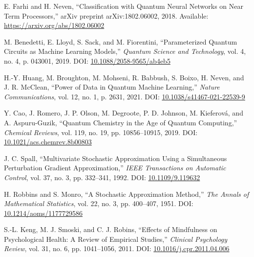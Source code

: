 \documentclass[11pt,letterpaper]{article}
\begin{document}
\begin{thebibliography}{99}
E. Farhi and H. Neven,
``Classification with Quantum Neural Networks on Near Term Processors,''
arXiv preprint arXiv:1802.06002, 2018.
Available: \url{https://arxiv.org/abs/1802.06002}

M. Benedetti, E. Lloyd, S. Sack, and M. Fiorentini,
``Parameterized Quantum Circuits as Machine Learning Models,''
\textit{Quantum Science and Technology}, vol. 4, no. 4, p. 043001, 2019.
DOI: \href{https://doi.org/10.1088/2058-9565/ab4eb5}{10.1088/2058-9565/ab4eb5}

H.-Y. Huang, M. Broughton, M. Mohseni, R. Babbush, S. Boixo, H. Neven, and J. R. McClean,
``Power of Data in Quantum Machine Learning,''
\textit{Nature Communications}, vol. 12, no. 1, p. 2631, 2021.
DOI: \href{https://doi.org/10.1038/s41467-021-22539-9}{10.1038/s41467-021-22539-9}

Y. Cao, J. Romero, J. P. Olson, M. Degroote, P. D. Johnson, M. Kieferová, and A. Aspuru-Guzik,
``Quantum Chemistry in the Age of Quantum Computing,''
\textit{Chemical Reviews}, vol. 119, no. 19, pp. 10856--10915, 2019.
DOI: \href{https://doi.org/10.1021/acs.chemrev.8b00803}{10.1021/acs.chemrev.8b00803}

J. C. Spall,
``Multivariate Stochastic Approximation Using a Simultaneous Perturbation Gradient Approximation,''
\textit{IEEE Transactions on Automatic Control}, vol. 37, no. 3, pp. 332--341, 1992.
DOI: \href{https://doi.org/10.1109/9.119632}{10.1109/9.119632}

H. Robbins and S. Monro,
``A Stochastic Approximation Method,''
\textit{The Annals of Mathematical Statistics}, vol. 22, no. 3, pp. 400--407, 1951.
DOI: \href{https://doi.org/10.1214/aoms/1177729586}{10.1214/aoms/1177729586}

S.-L. Keng, M. J. Smoski, and C. J. Robins,
``Effects of Mindfulness on Psychological Health: A Review of Empirical Studies,''
\textit{Clinical Psychology Review}, vol. 31, no. 6, pp. 1041--1056, 2011.
DOI: \href{https://doi.org/10.1016/j.cpr.2011.04.006}{10.1016/j.cpr.2011.04.006}

\end{thebibliography}
\end{document}
